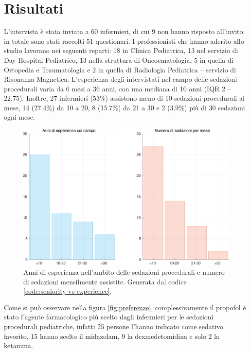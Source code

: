 \chapter{Risultati}

L'intervista è stata inviata a 60 infermieri, di cui 9 non hanno risposto all'invito: in totale sono stati raccolti 51 questionari. I professionisti che hanno aderito allo studio lavorano nei seguenti reparti: 18 in Clinica Pediatrica, 13 nel servizio di Day Hospital Pediatrico, 13 nella struttura di Oncoematologia, 5 in quella di Ortopedia e Traumatologia e 2 in quella di Radiologia Pediatrica -- servizio di Risonanza Magnetica. L'esperienza degli intervistati nel campo delle sedazioni procedurali varia da 6 mesi a 36 anni, con una mediana di 10 anni (IQR 2 -- 22.75). Inoltre, 27 infermieri (53$\%$) assistono meno di 10 sedazioni procedurali al mese, 14 (27.4$\%$) da 10 a 20, 8 (15.7$\%$) da 21 a 30 e 2 (3.9$\%$) più di 30 sedazioni ogni mese. 

\vfill

\begin{figure}[!ht]
    \centering
    \includegraphics[width=1\textwidth]{Figure/esperienzaVSfrequenza.pdf}
    \caption{Anni di esperienza nell'ambito delle sedazioni procedurali e numero di sedazioni mensilmente assistite. Generata dal codice \ref{code:seniority-vs-experience}.}
    \label{fig:esperienzavsfrequenza}
\end{figure}

\vfill

\newpage
Come si può osservare nella figura \ref{fig:preferenze}, complessivamente il propofol è stato l'agente farmacologico più scelto dagli infermieri per le sedazioni procedurali pediatriche, infatti 25 persone l'hanno indicato come sedativo favorito, 15 hanno scelto il midazolam, 9 la dexmedetomidina e solo 2 la ketamina. 

